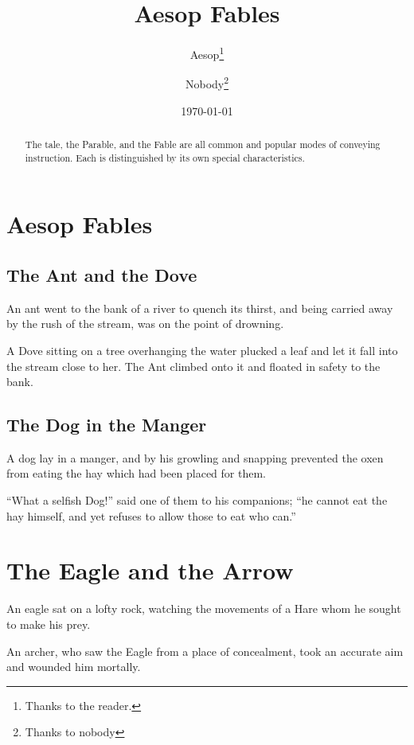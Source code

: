 \documentclass{report}
\title{Aesop Fables}
\author{Aesop\thanks{Thanks to the reader.}
       \and Nobody\thanks{Thanks to nobody}}
\date{\today}
\begin{document}
\maketitle
\begin{abstract}
The tale, the Parable, and the Fable are all common and popular
modes of conveying instruction. Each is distinguished by its own 
special characteristics.
\tableofcontents
\end{abstract}
\chapter{Aesop Fables}
\section{The Ant and the Dove}

An ant went to the bank of a river to quench its thirst, and
being carried away by the rush of the stream, was on the
point of drowning.

A Dove sitting on a tree overhanging the water plucked a
leaf and let it fall into the stream close to her. The Ant
climbed onto it and floated in safety to the bank.

\section{The Dog in the Manger}

A dog lay in a manger, and by his growling and snapping
prevented the oxen from eating the hay which had been
placed for them.

``What a selfish Dog!'' said one of them to his companions;
``he cannot eat the hay himself, and yet refuses to allow
those to eat who can.''

\chapter{The Eagle and the Arrow}

An eagle sat on a lofty rock, watching the movements of a
Hare whom he sought to make his prey.

An archer, who saw the Eagle from a place of concealment,
took an accurate aim and wounded him mortally.
\end{document}
